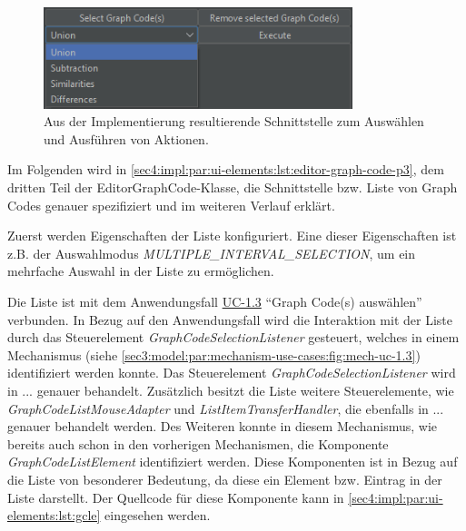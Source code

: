 \begin{figure}[!ht]
  \includegraphics[width=9cm]{chapter/chapter_4/wireframe-impl-ui-4}
  \caption{Aus der Implementierung resultierende Schnittstelle zum Auswählen und Ausführen von Aktionen.}
  \label{sec4:impl:par:ui-elements:fig:wireframe-ui-4}
\end{figure}

Im Folgenden wird in \cref{sec4:impl:par:ui-elements:lst:editor-graph-code-p3}, dem dritten Teil der EditorGraphCode-Klasse, die Schnittstelle  bzw. Liste von Graph Codes genauer spezifiziert und im weiteren Verlauf erklärt.



Zuerst werden Eigenschaften der Liste konfiguriert.
Eine dieser Eigenschaften ist z.B. der Auswahlmodus \textit{MULTIPLE\_INTERVAL\_SELECTION}, um ein mehrfache Auswahl in der Liste zu ermöglichen.

Die Liste ist mit dem Anwendungsfall \hyperref[sec3:model:uc-1.3]{UC-1.3} \enquote{Graph Code(s) auswählen} verbunden.
In Bezug auf den Anwendungsfall wird die Interaktion mit der Liste durch das Steuerelement \textit{GraphCodeSelectionListener} gesteuert, welches in einem Mechanismus (siehe \cref{sec3:model:par:mechanism-use-cases:fig:mech-uc-1.3}) identifiziert werden konnte.
Das Steuerelement \textit{GraphCodeSelectionListener} wird in ... genauer behandelt.
Zusätzlich besitzt die Liste weitere Steuerelemente, wie \textit{GraphCodeListMouseAdapter} und \textit{ListItemTransferHandler}, die ebenfalls in ... genauer behandelt werden.
Des Weiteren konnte in diesem Mechanismus, wie bereits auch schon in den vorherigen Mechanismen, die Komponente \textit{GraphCodeListElement} identifiziert werden.
Diese Komponenten ist in Bezug auf die Liste von besonderer Bedeutung, da diese ein Element bzw. Eintrag in der Liste darstellt.
Der Quellcode für diese Komponente kann in \cref{sec4:impl:par:ui-elements:lst:gcle} eingesehen werden.



